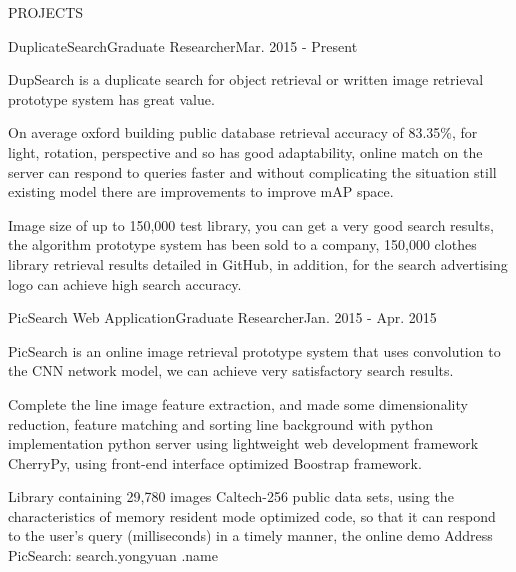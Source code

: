 \documentclass{resume} %
\begin{document}

\begin{rSection}{PROJECTS}

\begin{pSubsection}{DuplicateSearch}{Graduate Researcher}{Mar. 2015 - Present}
\item DupSearch is a duplicate search for object retrieval or written image retrieval prototype system has great value.
\item On average oxford building public database retrieval accuracy of 83.35\%, for light, rotation, perspective and so has good adaptability, online match on the server can respond to queries faster and without complicating the situation still existing model there are improvements to improve mAP space.
\item Image size of up to 150,000 test library, you can get a very good search results, the algorithm prototype system has been sold to a company, 150,000 clothes library retrieval results detailed in GitHub, in addition, for the search advertising logo can achieve high search accuracy.
\end{pSubsection}
\vspace{-0.5em}


\begin{pSubsection}{PicSearch  Web Application}{Graduate Researcher}{Jan. 2015 - Apr. 2015}
\item PicSearch is an online image retrieval prototype system that uses convolution to the CNN network model, we can achieve very satisfactory search results.
\item Complete the line image feature extraction, and made some dimensionality reduction, feature matching and sorting line background with python implementation python server using lightweight web development framework CherryPy, using front-end interface optimized Boostrap framework.
\item Library containing 29,780 images Caltech-256 public data sets, using the characteristics of memory resident mode optimized code, so that it can respond to the user's query (milliseconds) in a timely manner, the online demo Address PicSearch: search.yongyuan .name
\end{pSubsection}
\vspace{-0.5em}


\end{rSection}
\end{document}
